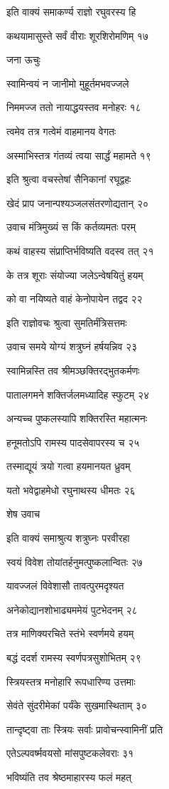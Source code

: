 इति वाक्यं समाकर्ण्य राज्ञो रघुवरस्य हि

कथयामासुस्ते सर्वं वीराः शूरशिरोमणिम् १७

जना ऊचुः

स्वामिन्वयं न जानीमो मुहूर्तमभवज्जले

निममज्ज ततो नायाद्धयस्तव मनोहरः १८

त्वमेव तत्र गत्वेमं वाहमानय वेगतः

अस्माभिस्तत्र गंतव्यं त्वया सार्द्धं महामते १९

इति श्रुत्वा वचस्तेषां सैनिकानां रघूद्वहः

खेदं प्राप जनान्पश्यञ्जलसंतरणोद्यतान् २०

उवाच मंत्रिमुख्यं स किं कर्तव्यमतः परम्

कथं वाहस्य संप्राप्तिर्भविष्यति वदस्व तत् २१

के तत्र शूराः संयोज्या जलेऽन्वेषयितुं हयम्

को वा नयिष्यते वाहं केनोपायेन तद्वद २२

इति राज्ञोवचः श्रुत्वा सुमतिर्मंत्रिसत्तमः

उवाच समये योग्यं शत्रुघ्नं हर्षयन्निव २३

स्वामिन्नस्ति तव श्रीमञ्छक्तिरद्भुतकर्मणः

पातालगमने शक्तिर्जलमध्यादिह स्फुटम् २४

अन्यच्च पुष्कलस्यापि शक्तिरस्ति महात्मनः

हनूमतोऽपि रामस्य पादसेवापरस्य च २५

तस्माद्यूयं त्रयो गत्वा हयमानयत ध्रुवम्

यतो भवेद्वाहमेधो रघुनाथस्य धीमतः २६

शेष उवाच

इति वाक्यं समाश्रुत्य शत्रुघ्नः परवीरहा

स्वयं विवेश तोयांतर्हनुमत्पुष्कलान्वितः २७

यावज्जलं विवेशासौ तावत्पुरमदृश्यत

अनेकोद्यानशोभाढ्यममेयं पुटभेदनम् २८

तत्र माणिक्यरचिते स्तंभे स्वर्णमये हयम्

बद्धं ददर्श रामस्य स्वर्णपत्रसुशोभितम् २९

स्त्रियस्तत्र मनोहारि रूपधारिण्य उत्तमाः

सेवंते सुंदरीमेकां पर्यंके सुखमास्थिताम् ३०

तान्दृष्ट्वा ताः स्त्रियः सर्वाः प्रावोचन्स्वामिनीं प्रति

एतेऽल्पवर्ष्मवयसो मांसपुष्टकलेवराः ३१

भविष्यंति तव श्रेष्ठमाहारस्य फलं महत्

